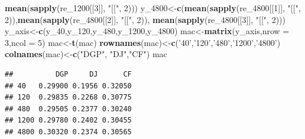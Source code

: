 \documentclass[
]{article}
\newenvironment{Shaded}{\begin{snugshade}}{\end{snugshade}}
\newcommand{\DataTypeTok}[1]{\textcolor[rgb]{0.13,0.29,0.53}{#1}}
\newcommand{\DecValTok}[1]{\textcolor[rgb]{0.00,0.00,0.81}{#1}}
\newcommand{\KeywordTok}[1]{\textcolor[rgb]{0.13,0.29,0.53}{\textbf{#1}}}
\newcommand{\NormalTok}[1]{#1}
\newcommand{\StringTok}[1]{\textcolor[rgb]{0.31,0.60,0.02}{#1}}
\begin{document}
\begin{Shaded}
\begin{Highlighting}[]
        \KeywordTok{mean}\NormalTok{(}\KeywordTok{sapply}\NormalTok{(re_}\DecValTok{1200}\NormalTok{[[}\DecValTok{3}\NormalTok{]], }\StringTok{"[["}\NormalTok{, }\DecValTok{2}\NormalTok{)))}
\NormalTok{y_}\DecValTok{4800}\NormalTok{<-}\KeywordTok{c}\NormalTok{(}\KeywordTok{mean}\NormalTok{(}\KeywordTok{sapply}\NormalTok{(re_}\DecValTok{4800}\NormalTok{[[}\DecValTok{1}\NormalTok{]], }\StringTok{"[["}\NormalTok{, }\DecValTok{2}\NormalTok{)),}\KeywordTok{mean}\NormalTok{(}\KeywordTok{sapply}\NormalTok{(re_}\DecValTok{4800}\NormalTok{[[}\DecValTok{2}\NormalTok{]], }\StringTok{"[["}\NormalTok{, }\DecValTok{2}\NormalTok{)),}
        \KeywordTok{mean}\NormalTok{(}\KeywordTok{sapply}\NormalTok{(re_}\DecValTok{4800}\NormalTok{[[}\DecValTok{3}\NormalTok{]], }\StringTok{"[["}\NormalTok{, }\DecValTok{2}\NormalTok{)))}
\NormalTok{y_axis<-}\KeywordTok{c}\NormalTok{(y_}\DecValTok{40}\NormalTok{,y_}\DecValTok{120}\NormalTok{,y_}\DecValTok{480}\NormalTok{,y_}\DecValTok{1200}\NormalTok{,y_}\DecValTok{4800}\NormalTok{)}
\NormalTok{mac<-}\KeywordTok{matrix}\NormalTok{(y_axis,}\DataTypeTok{nrow =} \DecValTok{3}\NormalTok{,}\DataTypeTok{ncol =} \DecValTok{5}\NormalTok{)}
\NormalTok{mac<-}\KeywordTok{t}\NormalTok{(mac)}
\KeywordTok{rownames}\NormalTok{(mac)<-}\KeywordTok{c}\NormalTok{(}\StringTok{'40'}\NormalTok{,}\StringTok{'120'}\NormalTok{,}\StringTok{'480'}\NormalTok{,}\StringTok{'1200'}\NormalTok{,}\StringTok{'4800'}\NormalTok{)}
\KeywordTok{colnames}\NormalTok{(mac)<-}\KeywordTok{c}\NormalTok{(}\StringTok{"DGP"}\NormalTok{, }\StringTok{"DJ"}\NormalTok{,}\StringTok{"CF"}\NormalTok{)}
\NormalTok{mac}
\end{Highlighting}
\end{Shaded}

\begin{verbatim}
##          DGP     DJ      CF
## 40   0.29900 0.1956 0.32050
## 120  0.29835 0.2268 0.30775
## 480  0.29505 0.2377 0.30240
## 1200 0.29780 0.2402 0.30455
## 4800 0.30320 0.2374 0.30565
\end{verbatim}
\end{document}
